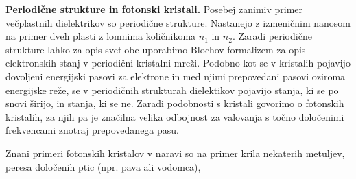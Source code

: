 \begin{example}{\bf Periodične strukture in fotonski kristali.}
Posebej zanimiv primer večplastnih dielektrikov so periodične strukture. Nastanejo z izmeničnim
nanosom na primer dveh plasti z lomnima količnikoma $n_1$ in $n_2$. Zaradi periodične strukture
lahko za opis svetlobe uporabimo Blochov formalizem za opis elektronskih stanj v periodični 
kristalni mreži. Podobno kot se v kristalih pojavijo dovoljeni energijski pasovi za elektrone 
in med njimi prepovedani pasovi oziroma energijske reže, se v periodičnih strukturah dielektikov
pojavijo stanja, ki se po snovi širijo, in stanja, ki se ne. Zaradi podobnosti s kristali
govorimo o fotonskih kristalih, za njih pa je značilna velika odbojnost za valovanja s točno
določenimi frekvencami znotraj prepovedanega pasu. 

Znani primeri fotonskih kristalov v naravi so na primer krila nekaterih metuljev, peresa
določenih ptic (npr. pava ali vodomca), 
 
 
\end{example}







